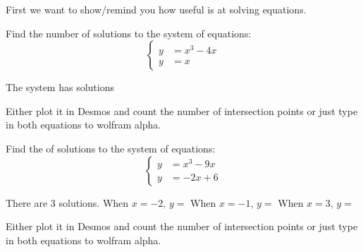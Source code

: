 \documentclass{ximera}
\begin{document}
First we want to show/remind you how useful  is at solving equations.

\begin{question}
Find the number of solutions to the system of equations:
\[
\begin{cases}
y&=x^3-4x\\
y&=x
\end{cases}
\]
\begin{solution}
The system has  solutions
\begin{hint}
Either plot it in Desmos and count the number of intersection points or just type in both equations to wolfram alpha.
\end{hint}
\end{solution}
\end{question}



\begin{question}
Find the of solutions to the system of equations:
\[
\begin{cases}
y&=x^3-9x\\
y&=-2x+6
\end{cases}
\]
\begin{solution}
There are $3$ solutions. 
When $x=-2$, $y=$ 
When $x=-1$, $y=$ 
When $x=3$, $y=$ 

\begin{hint}
Either plot it in Desmos and count the number of intersection points or just type in both equations to wolfram alpha.
\end{hint}
\end{solution}
\end{question}
\end{document}
